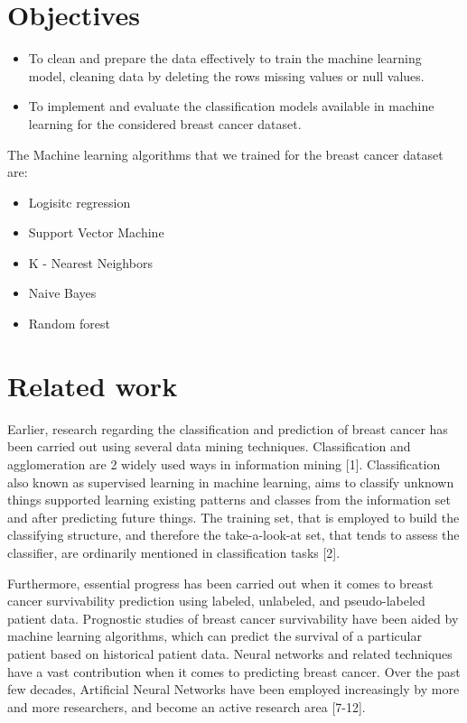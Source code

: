 \documentclass[conference]{IEEEtran}
\begin{document}
\section{Objectives}
\begin{itemize}
    \item To clean and prepare the data effectively to train the machine learning model, cleaning data by deleting the rows missing values or null values.
    \item To implement and evaluate the classification models available in machine learning for the considered breast cancer dataset. 
\end{itemize}
The Machine learning algorithms that we trained for the breast cancer dataset are:
\begin{itemize}
  \item Logisitc regression
  \item Support Vector Machine
  \item K - Nearest Neighbors
  \item Naive Bayes
  \item Random forest
\end{itemize}

\section{Related work}

Earlier, research regarding the classification and prediction of breast cancer has been carried out using several data mining techniques. Classification and agglomeration are 2 widely used ways in information mining [1].
Classification also known as supervised learning in machine learning, aims to classify unknown things supported learning existing patterns and classes from the information set and after predicting future things. The training set, that is employed to build the classifying structure, and therefore the take-a-look-at set, that tends to assess the classifier, are ordinarily mentioned in
classification tasks [2].

Furthermore, essential progress has been carried out when it comes to breast cancer survivability prediction using labeled, unlabeled, and pseudo-labeled patient data. Prognostic studies of breast cancer survivability have been aided by machine learning algorithms, which can predict the survival of a particular patient based on historical patient data. Neural networks and related techniques have a vast contribution when it comes to predicting breast cancer. Over the past few decades, Artificial Neural Networks have been employed increasingly by more and more researchers, and become an active research area [7-12]. 
\end{document}
